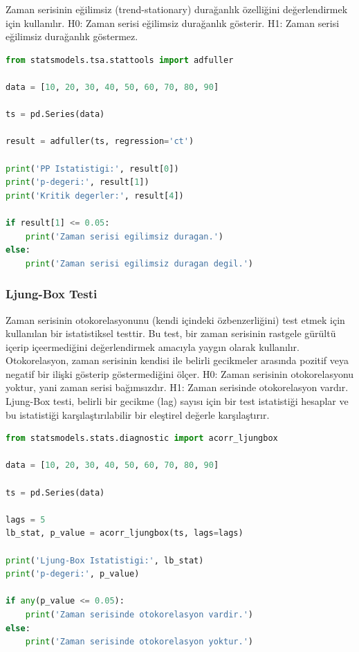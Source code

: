 Zaman serisinin eğilimsiz (trend-stationary) durağanlık özelliğini değerlendirmek için kullanılır. H0: Zaman serisi eğilimsiz durağanlık gösterir. H1: Zaman serisi eğilimsiz durağanlık göstermez.

\begin{lstlisting}[language=Python]
from statsmodels.tsa.stattools import adfuller

data = [10, 20, 30, 40, 50, 60, 70, 80, 90]

ts = pd.Series(data)

result = adfuller(ts, regression='ct')

print('PP Istatistigi:', result[0])
print('p-degeri:', result[1])
print('Kritik degerler:', result[4])

if result[1] <= 0.05:
    print('Zaman serisi egilimsiz duragan.')
else:
    print('Zaman serisi egilimsiz duragan degil.')
\end{lstlisting}

\newpage

\subsubsection{Ljung-Box Testi}

Zaman serisinin otokorelasyonunu (kendi içindeki özbenzerliğini) test etmek için kullanılan bir istatistiksel testtir. Bu test, bir zaman serisinin rastgele gürültü içerip içeermediğini değerlendirmek amacıyla yaygın olarak kullanılır. Otokorelasyon, zaman serisinin kendisi ile belirli gecikmeler arasında pozitif veya negatif bir ilişki gösterip göstermediğini ölçer. H0: Zaman serisinin otokorelasyonu yoktur, yani zaman serisi bağımsızdır. H1: Zaman serisinde otokorelasyon vardır. Ljung-Box testi, belirli bir gecikme (lag) sayısı için bir test istatistiği hesaplar ve bu istatistiği karşılaştırılabilir bir eleştirel değerle karşılaştırır.

\begin{lstlisting}[language=Python]
from statsmodels.stats.diagnostic import acorr_ljungbox

data = [10, 20, 30, 40, 50, 60, 70, 80, 90]

ts = pd.Series(data)

lags = 5
lb_stat, p_value = acorr_ljungbox(ts, lags=lags)

print('Ljung-Box Istatistigi:', lb_stat)
print('p-degeri:', p_value)

if any(p_value <= 0.05):
    print('Zaman serisinde otokorelasyon vardir.')
else:
    print('Zaman serisinde otokorelasyon yoktur.')
\end{lstlisting}

